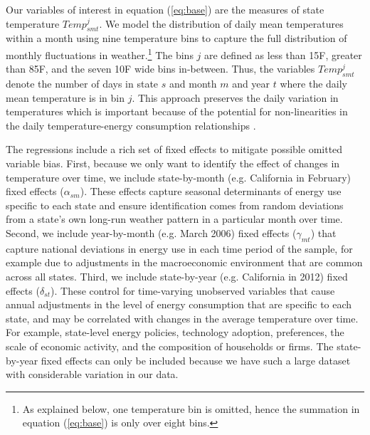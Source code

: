 \documentclass[11pt]{article}
\begin{document}
Our variables of interest in equation (\ref{eq:base}) are the measures of state temperature $Temp_{smt}^{j}$. We model the distribution of daily mean temperatures within a month using nine temperature bins to capture the full distribution of monthly fluctuations in weather.\footnote{As explained below, one temperature bin is omitted, hence the summation in equation (\ref{eq:base}) is only over eight bins.} The bins $j$ are defined as less than 15\degree F, greater than 85\degree F, and the seven 10\degree F wide bins in-between. %
Thus, the variables $Temp_{smt}^{j}$ denote the number of days in state $s$ and month $m$ and year $t$ where the daily mean temperature is in bin $j$. This approach preserves the daily variation in temperatures which is important because of the potential for non-linearities in the daily temperature-energy consumption relationships \citep{Green2011}.

The regressions include a rich set of fixed effects to mitigate possible omitted variable bias. First, because we only want to identify the effect of changes in temperature over time, we include state-by-month (e.g. California in February) fixed effects ($\alpha_{sm}$). These effects capture seasonal determinants of energy use specific to each state and ensure identification comes from random deviations from a state's own long-run weather pattern in a particular month over time. Second, we include year-by-month (e.g. March 2006) fixed effects ($\gamma_{mt}$) that capture national deviations in energy use in each time period of the sample, for example due to adjustments in the macroeconomic environment that are common across all states. Third, we include state-by-year (e.g. California in 2012) fixed effects ($\delta_{st}$). These control for time-varying unobserved variables that cause annual adjustments in the level of energy consumption that are specific to each state, and may be correlated with changes in the average temperature over time. For example, state-level energy policies, technology adoption, preferences, the scale of economic activity, and the composition of households or firms. The state-by-year fixed effects can only be included because we have such a large dataset with considerable variation in our data.
\end{document}
